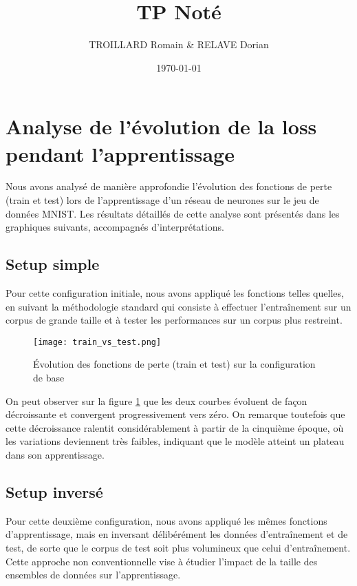 \documentclass{article}
\title{\textbf{TP Noté}}
\author{TROILLARD Romain \& RELAVE Dorian}
\date{\today}
\begin{document}
\maketitle

\tableofcontents

\newpage

\section{Analyse de l'évolution de la loss pendant l'apprentissage}

Nous avons analysé de manière approfondie l'évolution des fonctions de perte (train et test) lors de l'apprentissage d'un réseau de neurones sur le jeu de données MNIST. Les résultats détaillés de cette analyse sont présentés dans les graphiques suivants, accompagnés d'interprétations.

\subsection{Setup simple}

Pour cette configuration initiale, nous avons appliqué les fonctions telles quelles, en suivant la méthodologie standard qui consiste à effectuer l'entraînement sur un corpus de grande taille et à tester les performances sur un corpus plus restreint.

\begin{figure}[H]
    \centering
    \texttt{[image: train\_vs\_test.png]}
    \caption{Évolution des fonctions de perte (train et test) sur la configuration de base}
    \label{fig:train_vs_test}
\end{figure}

On peut observer sur la figure \ref{fig:train_vs_test} que les deux courbes évoluent de façon décroissante et convergent progressivement vers zéro. On remarque toutefois que cette décroissance ralentit considérablement à partir de la cinquième époque, où les variations deviennent très faibles, indiquant que le modèle atteint un plateau dans son apprentissage.

\newpage
\subsection{Setup inversé}

Pour cette deuxième configuration, nous avons appliqué les mêmes fonctions d'apprentissage, mais en inversant délibérément les données d'entraînement et de test, de sorte que le corpus de test soit plus volumineux que celui d'entraînement. Cette approche non conventionnelle vise à étudier l'impact de la taille des ensembles de données sur l'apprentissage.
\end{document}
